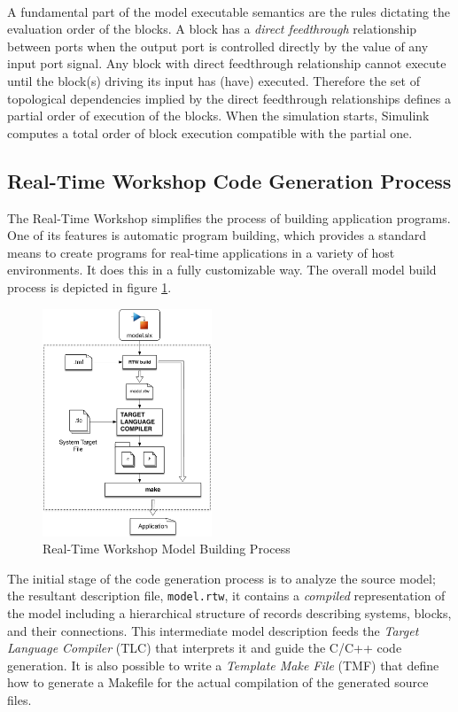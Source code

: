 \paragraph{} A fundamental part of the model executable semantics are the rules dictating the evaluation order of the blocks. A block has a \emph{direct feedthrough} relationship between ports when the output port is controlled directly by the value of any input port signal. Any block with direct feedthrough relationship cannot execute until the block(s) driving its input has (have) executed. Therefore the set of topological dependencies implied by the direct feedthrough relationships defines a partial order of execution of the blocks. When the simulation starts, Simulink computes a total order of block execution compatible with the partial one.

\subsection{Real-Time Workshop Code Generation Process}
\label{sec:RTWGenerationProcess}
The Real-Time Workshop simplifies the process of building application programs. One of its features is automatic program building, which provides a standard means to create programs for real-time applications in a variety of host environments. It does this in a fully customizable way. The overall model build process is depicted in figure \ref{fig:RTWBuildProcess}.

\begin{figure}[htbp] 
\centering    
\includegraphics[width=0.45\textwidth]{RTWBuildProcess}
\caption{Real-Time Workshop Model Building Process}
\label{fig:RTWBuildProcess}
\end{figure}
The initial stage of the code generation process is to analyze the source model; the resultant description file, \verb|model.rtw|, it contains a \emph{compiled} representation of the model including a hierarchical structure of records describing systems, blocks, and their connections. This intermediate model description feeds the \emph{Target Language Compiler\textregistered} (TLC) that interprets it and guide the C/C++ code generation. It is also possible to write a \emph{Template Make File} (TMF) that define how to generate a Makefile for the actual compilation of the generated source files.

